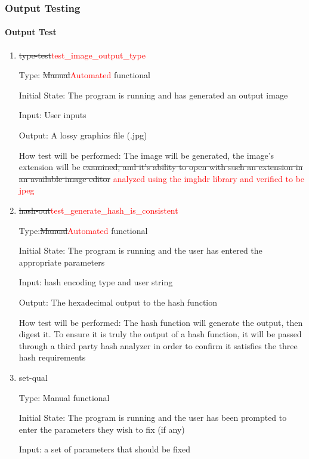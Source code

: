\documentclass[12pt, titlepage]{article}
\begin{document}
\subsubsection{Output Testing}

\paragraph{Output Test}

\begin{enumerate}

\item{\st{type-test}\textcolor{red}{test\_image\_output\_type}\\}


Type: \st{Manual}\textcolor{red}{Automated} functional

Initial State: The program is running and has generated an output image

Input: User inputs

Output: A lossy graphics file (.jpg)

How test will be performed: The image will be generated, the image's extension will be \st{examined, and it's ability to open with such an extension in an available image editor} \textcolor{red}{analyzed using the imghdr library and verified to be jpeg}

\item{\st{hash-out}\textcolor{red}{test\_generate\_hash\_is\_consistent}}

Type:\st{Manual}\textcolor{red}{Automated} functional

Initial State: The program is running and the user has entered the appropriate parameters

Input: hash encoding type and user string

Output: The hexadecimal output to the hash function

How test will be performed: The hash function will generate the output, then digest it. To ensure it is truly the output of a hash function, it will be passed through a third party hash analyzer in order to confirm it satisfies the three hash requirements

\item{set-qual}

Type: Manual functional

Initial State: The program is running and the user has been prompted to enter the parameters they wish to fix (if any)

Input: a set of parameters that should be fixed


\end{enumerate}
\end{document}
